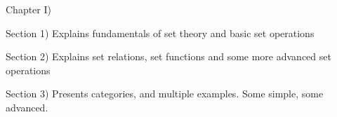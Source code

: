 Chapter I)

Section 1) Explains fundamentals of set theory and basic set operations

Section 2) Explains set relations, set functions and some more advanced set operations

Section 3) Presents categories, and multiple examples. Some simple, some advanced.